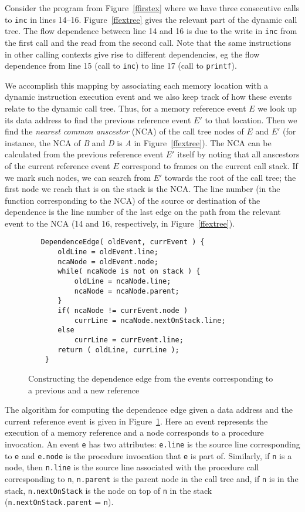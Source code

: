 \documentclass{acm_proc_article-sp}
\begin{document}
Consider the program from Figure~\ref{ffirstex} where we have three consecutive
calls to {\tt inc} in lines 14--16. Figure~\ref{ffextree} gives the relevant 
part of the dynamic call tree. The flow dependence between line 14 and 16 is due 
to the write in {\tt inc} from the first call and the read from the second call.
Note that the same instructions in other calling contexts give rise to 
different dependencies, eg the flow dependence from line 15 (call to {\tt inc})
to line 17 (call to {\tt printf}).

We accomplish this mapping by associating each memory location with a dynamic
instruction execution event and we also keep track of how these events 
relate to the dynamic call tree. Thus, for a memory reference event $E$ we 
look up its data address to find the previous reference event $E'$ to that 
location. Then we find the {\em nearest common anscestor} (NCA) of the call
tree nodes of $E$ and $E'$ (for instance, the NCA of {\it B} and {\it D} is
{\it A} in Figure~\ref{ffextree}). The NCA can be calculated from the previous
reference event $E'$ itself by noting that all anscestors of the current
reference event $E$ correspond to frames on the current call stack. If we mark 
such nodes, we can search from $E'$ 
towards the root of the call tree; the first node we reach that is on the 
stack is the NCA.
The line number (in the function corresponding to the NCA) of the source or 
destination of the dependence is the line number of the last edge on the path 
from the relevant event to the NCA (14 and 16, respectively, in 
Figure~\ref{ffextree}).


\begin{figure}
\small
\hrulefill
\begin{verbatim}
   DependenceEdge( oldEvent, currEvent ) {
       oldLine = oldEvent.line;
       ncaNode = oldEvent.node;
       while( ncaNode is not on stack ) {
           oldLine = ncaNode.line;
           ncaNode = ncaNode.parent;
       }
       if( ncaNode != currEvent.node )
           currLine = ncaNode.nextOnStack.line;
       else
           currLine = currEvent.line;
       return ( oldLine, currLine );
    }
\end{verbatim}
\hrulefill
\caption{Constructing the dependence edge from the events corresponding
to a previous and a new reference}
\label{fdepedge}
\end{figure}    

The algorithm for computing the dependence edge given a data address and 
the current reference event is given in Figure~\ref{fdepedge}. Here an 
event represents the execution of a memory reference and a node corresponds 
to a procedure invocation. An event {\tt e} has two attributes: {\tt e.line} 
is the source line corresponding to {\tt e} and {\tt e.node} is the procedure 
invocation that {\tt e} is part of. Similarly, if {\tt n} is a node, then 
{\tt n.line} is the source line associated with the procedure call 
corresponding to {\tt n}, {\tt n.parent} is the parent node in the call tree 
and, if {\tt n} is in the stack, {\tt n.nextOnStack} is the node on top of 
{\tt n} in the stack ({\tt n.nextOnStack.parent} = {\tt n}).
\end{document}
